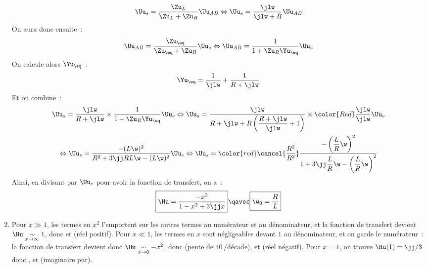 \documentclass[a4paper, 12pt, final, garamond]{book}
\begin{document}
\begin{enumerate}
        \begin{gather*}
            \Uu_s = \frac{\Zu_L}{\Zu_L + \Zu_R}\Uu_{AB}
            \Leftrightarrow
            \Uu_s = \frac{\jlw}{\jlw + R}\Uu_{AB}
        \end{gather*}
        On aura donc ensuite~:
        \begin{gather*}
            \Uu_{AB} = \frac{\Zu_{\eq}}{\Zu_{\eq} + \Zu_R}\Uu_e
            \Leftrightarrow
            \Uu_{AB} = \frac{1}{1+\Zu_R\Yu_{\eq}}\Uu_e
        \end{gather*}
        On calcule alors $\Yu_{\eq}$~:
        \begin{gather*}
            \Yu_{\eq} = \frac{1}{\jlw} + \frac{1}{R+\jlw}
        \end{gather*}
        Et on combine~:
        \begin{gather*}
            \Uu_s =
                \frac{\jlw}{R+\jlw}\times\frac{1}{1+\Zu_R\Yu_{\eq}}\Uu_e
            \Leftrightarrow
            \Uu_s =
                \frac{\jlw}{R + \jlw + R \left( \dfrac{R+\jlw}{\jlw} + 1
                \right)}\times {\color{Red} \frac{\jlw}{\jlw}}\Uu_e\\
            \Leftrightarrow
            \Uu_s =
                \frac{-(L\w)^2}{R^2 + 3\jj RL\w - (L\w)^2}\Uu_e
            \Leftrightarrow
            \Uu_s =
                {\color{red}\cancel{\frac{R^2}{R^2}}}
                \frac{- \left( \dfrac{L}{R}\w \right)^2}{1 + 3\jj \dfrac{L}{R}\w
                - \left( \dfrac{L}{R}\w \right)^2}
        \end{gather*}
        Ainsi, en divisant par $\Uu_e$ pour avoir la fonction de transfert, on
        a~:
        \begin{gather*}
            \boxed{\Hu = \frac{-x^2}{1-x^2+3\jj x}}
            \qavec
            \boxed{\w_0 = \frac{R}{L}}
        \end{gather*}
    \item Pour $x \gg 1$, les termes en $x^2$ l'emportent sur les autres termes
        au numérateur et au dénominateur, et la fonction de transfert devient
        $\Hu \underset{x\rightarrow\infty}{\sim} 1$, donc 
        et  (réel positif). \bigbreak
        Pour $x \ll 1$, les termes en $x$ sont négligeables devant $1$ au
        dénominateur, et on garde le numérateur~: la fonction de transfert
        devient donc $\Hu \underset{x\rightarrow0}{\sim} -x^2$, donc
         (pente de
        40\,\dB/décade), et \fbox{$\f = -\pi$} (réel négatif). \bigbreak
        Pour $x = 1$, on trouve $\Hu(1) = \jj/3$ donc , et  (imaginaire pur).
\end{enumerate}
\end{document}
